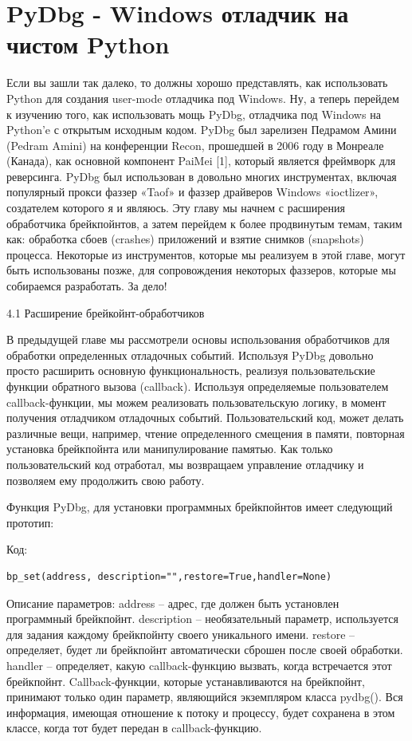 \documentclass[12pt]{book}
\begin{document}
\chapter{PyDbg - Windows отладчик на чистом Python}

Если вы зашли так далеко, то должны хорошо представлять, как использовать Python для создания user-mode отладчика под Windows. Ну, а теперь перейдем к изучению того, как использовать мощь PyDbg, отладчика под Windows на Python’e с открытым исходным кодом. PyDbg был зарелизен Педрамом Амини (Pedram Amini) на конференции Recon, прошедшей в 2006 году в Монреале (Канада), как основной компонент PaiMei [1], который является фреймворк для реверсинга. PyDbg был использован в довольно многих инструментах, включая популярный прокси фаззер «Taof» и фаззер драйверов Windows «ioctlizer», создателем которого я и являюсь. Эту главу мы начнем с расширения обработчика брейкпойнтов, а затем перейдем к более продвинутым темам, таким как: обработка сбоев (crashes) приложений и взятие снимков (snapshots) процесса. Некоторые из инструментов, которые мы реализуем в этой главе, могут быть использованы позже, для сопровождения некоторых фаззеров, которые мы собираемся разработать. За дело!


4.1 Расширение брейкойнт-обработчиков

В предыдущей главе мы рассмотрели основы использования обработчиков для обработки определенных отладочных событий. Используя PyDbg довольно просто расширить основную функциональность, реализуя пользовательские функции обратного вызова (callback). Используя определяемые пользователем callback-функции, мы можем реализовать пользовательскую логику, в момент получения отладчиком отладочных событий. Пользовательский код, может делать различные вещи, например, чтение определенного смещения в памяти, повторная установка брейкпойнта или манипулирование памятью. Как только пользовательский код отработал, мы возвращаем управление отладчику и позволяем ему продолжить свою работу.

Функция PyDbg, для установки программных брейкпойнтов имеет следующий прототип:

Код:
\begin{lstlisting}
bp_set(address, description="",restore=True,handler=None)
\end{lstlisting}
Описание параметров:
address – адрес, где должен быть установлен программный брейкпойнт.
description – необязательный параметр, используется для задания каждому брейкпойнту своего уникального имени.
restore – определяет, будет ли брейкпойнт автоматически сброшен после своей обработки.
handler – определяет, какую callback-функцию вызвать, когда встречается этот брейкпойнт. Callback-функции, которые устанавливаются на брейкпойнт, принимают только один параметр, являющийся экземпляром класса pydbg(). Вся информация, имеющая отношение к потоку и процессу, будет сохранена в этом классе, когда тот будет передан в callback-функцию.
\end{document}
